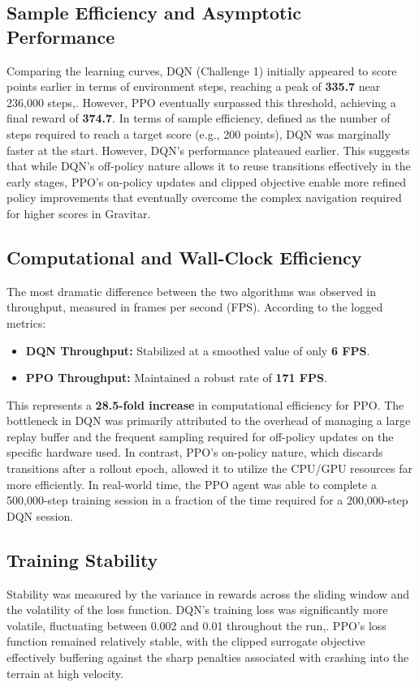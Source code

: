 \documentclass[conference]{IEEEtran}
\begin{document}
\subsection{Sample Efficiency and Asymptotic Performance}
Comparing the learning curves, DQN (Challenge 1) initially appeared to score points earlier in terms of environment steps, reaching a peak of \textbf{335.7} near 236,000 steps,.
However, PPO eventually surpassed this threshold, achieving a final reward of \textbf{374.7}.
In terms of sample efficiency, defined as the number of steps required to reach a target score (e.g., 200 points), DQN was marginally faster at the start.
However, DQN's performance plateaued earlier. This suggests that while DQN's off-policy nature allows it to reuse transitions effectively in the early stages, PPO's on-policy updates and clipped objective enable more refined policy improvements that eventually overcome the complex navigation required for higher scores in Gravitar.

\subsection{Computational and Wall-Clock Efficiency}
The most dramatic difference between the two algorithms was observed in throughput, measured in frames per second (FPS).
According to the logged metrics:
\begin{itemize}
    \item \textbf{DQN Throughput:} Stabilized at a smoothed value of only \textbf{6 FPS}.
    \item \textbf{PPO Throughput:} Maintained a robust rate of \textbf{171 FPS}.
\end{itemize}

This represents a \textbf{28.5-fold increase} in computational efficiency for PPO.
The bottleneck in DQN was primarily attributed to the overhead of managing a large replay buffer and the frequent sampling required for off-policy updates on the specific hardware used.
In contrast, PPO’s on-policy nature, which discards transitions after a rollout epoch, allowed it to utilize the CPU/GPU resources far more efficiently.
In real-world time, the PPO agent was able to complete a 500,000-step training session in a fraction of the time required for a 200,000-step DQN session.

\subsection{Training Stability}
Stability was measured by the variance in rewards across the sliding window and the volatility of the loss function.
DQN's training loss was significantly more volatile, fluctuating between 0.002 and 0.01 throughout the run,.
PPO's loss function remained relatively stable, with the clipped surrogate objective effectively buffering against the sharp penalties associated with crashing into the terrain at high velocity.
\end{document}

